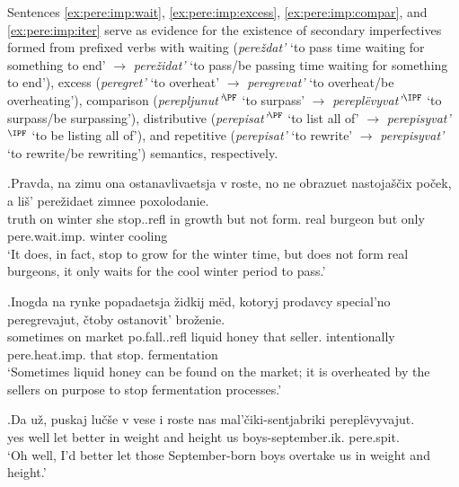 Sentences \ref{ex:pere:imp:wait}, \ref{ex:pere:imp:excess}, \ref{ex:pere:imp:compar}, and \ref{ex:pere:imp:iter} serve as evidence for the existence of secondary imperfectives formed from prefixed verbs with waiting (\textit{pere\v{z}dat'} `to pass time waiting for something to end' $\rightarrow$ \textit{pere\v{z}idat'}  `to pass/be passing time waiting for something to end'), excess (\textit{peregret'} `to overheat' $\rightarrow$ \textit{peregrevat'} `to overheat/be overheating'), comparison (\textit{perepljunut'$^{\PF}$} `to surpass' $\rightarrow$ \textit{perepl\"{e}vyvat'$^{\IPF}$} `to surpass/be surpassing'), distributive (\textit{perepisat'$^{\PF}$} `to list all of' $\rightarrow$ \textit{perepisyvat'$^{\IPF}$} `to be listing all of'), and repetitive (\textit{perepisat'} `to rewrite' $\rightarrow$ \textit{perepisyvat'} `to rewrite/be rewriting') semantics, respectively.

\exg.\label{ex:pere:imp:wait}Pravda, na zimu ona ostanavlivaetsja v roste, no ne obrazuet nastoja\v{s}\v{c}ix po\v{c}ek, a li\v{s}' pere\v{z}idaet zimnee poxolodanie.\\
truth on winter she stop..refl in growth but not form. real burgeon but only pere.wait.imp. winter cooling\\
\trans `It does, in fact, stop to grow for the winter time, but does not form real burgeons, it only waits for the cool winter period to pass.'\\

\exg.\label{ex:pere:imp:excess}Inogda na rynke popadaetsja \v{z}idkij m\"{e}d, kotoryj prodavcy special'no peregrevajut, \v{c}toby ostanovit' bro\v{z}enie.\\
sometimes on market po.fall..refl liquid honey that seller. intentionally pere.heat.imp. that stop. fermentation\\
`Sometimes liquid honey can be found on the market; it is overheated by the sellers on purpose to stop fermentation processes.'\\

\exg.\label{ex:pere:imp:compar}Da u\v{z}, puskaj lu\v{c}\v{s}e v vese i roste nas mal'\v{c}iki-sentjabriki perepl\"{e}vyvajut.\\
yes well let better in weight and height us boys-september.ik. pere.spit.\\
\trans `Oh well, I'd better let those September-born boys overtake us in weight and height.'


